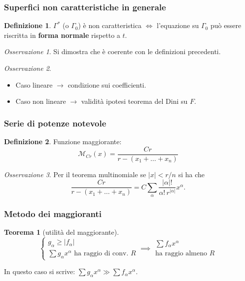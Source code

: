\documentclass[serif,notheorems]{beamer}
\theoremstyle{definition} %
\newtheorem{theorem}{Teorema}[section] %
\newtheorem{definition}{Definizione}[section] %
\theoremstyle{remark}
\newtheorem*{remark}{Osservazione}
\begin{document}
\begin{frame}
\frametitle{Superfici non caratteristiche in generale}
\begin{definition}
$\Gamma^*$ (o $\Gamma_0$) è non caratteristica $\iff$ l'equazione su $\Gamma_0$ può essere riscritta in \textbf{forma normale} rispetto a $t$.
\end{definition}
\begin{remark}
Si dimostra che è coerente con le definizioni precedenti.
\end{remark}
\begin{remark}
\begin{itemize}
\item Caso lineare $\rightarrow$ condizione sui coefficienti.
\item Caso non lineare $\rightarrow$ validità ipotesi teorema del Dini su $F$.
\end{itemize}
\end{remark}
\end{frame}


\begin{frame}
\frametitle{Serie di potenze notevole}
\begin{definition}
Funzione maggiorante: $$\mathcal{M}_{Cr}(x)=\frac{Cr}{r-(x_1+\ldots +x_n)}$$
\end{definition}
\begin{remark}
Per il teorema multinomiale se $|x|<r/n$ si ha che
$$\frac{Cr}{r-(x_1+\ldots +x_n)}=C \sum\limits_\alpha \frac{|\alpha |!}{\alpha ! \, r^{|\alpha |}} x^\alpha.$$
\end{remark}
\end{frame}

\begin{frame}
\frametitle{Metodo dei maggioranti}
\begin{theorem}[utilità del maggiorante]
\begin{equation*}
\begin{cases}
g_\alpha \geq |f_\alpha|\\
\sum g_\alpha x^\alpha \text{ ha raggio di conv. } R
\end{cases}
\implies 
\begin{array}{c}
\sum f_\alpha x^\alpha \\
\text{ha raggio almeno } R
\end{array}
\end{equation*}
\end{theorem}
In questo caso si scrive:  $\sum g_\alpha x^\alpha \gg \sum f_\alpha x^\alpha$.
\end{frame}
\end{document}
